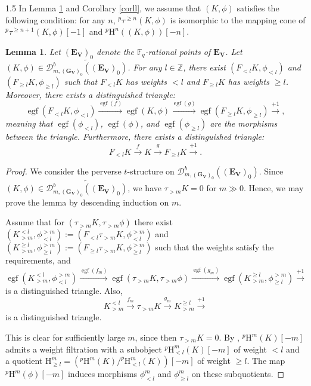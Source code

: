 \documentclass[10pt]{amsart}
\newtheorem{lemma}[theorem]{Lemma}
\begin{document}
\begin{spacing}{1.5}
In Lemma \ref{leqq} and Corollary \ref{corll}, we assume that $(K,\phi)$ satisfies the following condition: for any $n$, ${}^p\tau^{\geq n}(K,\phi)$ is isomorphic to the mapping cone of ${}^p\tau^{\geq n+1}(K,\phi)[-1]$ and ${}^p\mathrm{H}^n((K,\phi))[-n]$.
\begin{lemma}\label{leqq}
Let $(\mathbf{E}_{\mathbf{V}})_0$ denote the $\mathbb{F}_q$-rational points of $\mathbf{E}_{\mathbf{V}}$. Let $(K,\phi) \in \widetilde{\mathcal{D}^{b}_{m,(\mathbf{G}_{\mathbf{V}})_0}((\mathbf{E}_{\mathbf{V}})_0)}$. For any $l \in \mathbb{Z}$, there exist $(F_{<l}K,\phi_{<l})$ and $(F_{\geq l}K,\phi_{\geq l})$ such that $F_{<l}K$ has weights $< l$ and $F_{\geq l}K$ has weights $\geq l$. Moreover, there exists a distinguished triangle:
\[
\operatorname{egf}(F_{<l}K,\phi_{<l}) \xrightarrow{\operatorname{egf}(f)} \operatorname{egf}(K,\phi) \xrightarrow{\operatorname{egf}(g)} \operatorname{egf}(F_{\geq l}K,\phi_{\geq l}) \xrightarrow{+1},
\]
meaning that $\operatorname{egf}(\phi_{<l})$, $\operatorname{egf}(\phi)$, and $\operatorname{egf}(\phi_{\geq l})$ are the morphisms between the triangle. Furthermore, there exists a distinguished triangle:
\[
F_{<l}K \xrightarrow{f} K \xrightarrow{g} F_{\geq l}K \xrightarrow{+1}.
\]
\end{lemma}

\begin{proof}
We consider the perverse $t$-structure on $\mathcal{D}^b_{m,(\mathbf{G}_{\mathbf{V}})_0}((\mathbf{E}_{\mathbf{V}})_0)$. Since $(K,\phi) \in \widetilde{\mathcal{D}^{b}_{m,(\mathbf{G}_{\mathbf{V}})_0}((\mathbf{E}_{\mathbf{V}})_0)}$, we have $\tau_{>m}K = 0$ for $m \gg 0$. Hence, we may prove the lemma by descending induction on $m$.

Assume that for $(\tau_{>m}K,\tau_{>m}\phi)$ there exist $(K_{>m}^{<l},\phi^{>m}_{<l}) := (F_{<l} \tau_{>m}K, \phi^{>m}_{<l})$ and $(K_{>m}^{\geq l},\phi^{>m}_{\geq l}) := (F_{\geq l} \tau_{>m}K, \phi^{>m}_{\geq l})$ such that the weights satisfy the requirements, and
\[
\operatorname{egf}(K_{>m}^{<l},\phi^{>m}_{<l}) \xrightarrow{\operatorname{egf}(f_m)} \operatorname{egf}(\tau_{>m}K,\tau_{>m}\phi) \xrightarrow{\operatorname{egf}(g_m)} \operatorname{egf}(K_{>m}^{\geq l},\phi^{>m}_{\geq l}) \xrightarrow{+1}
\]
is a distinguished triangle. Also,
\[
K_{>m}^{<l} \xrightarrow{f_m} \tau_{>m}K \xrightarrow{g_m} K_{>m}^{\geq l} \xrightarrow{+1}
\]
is a distinguished triangle.

This is clear for sufficiently large $m$, since then $\tau_{>m}K = 0$. By \cite[Theorem 5.4.16]{Pramod-2021}, $^{p}\mathrm{H}^m(K)[-m]$ admits a weight filtration with a subobject $^{p}\mathrm{H}^m_{<l}(K)[-m]$ of weight $< l$ and a quotient $\mathrm{H}^m_{\geq l} = (^{p}\mathrm{H}^m(K)/^{p}\mathrm{H}^m_{<l}(K))[-m]$ of weight $\geq l$. The map $^{p}\mathrm{H}^m(\phi)[-m]$ induces morphisms $\phi^m_{<l}$ and $\phi^m_{\geq l}$ on these subquotients.


\end{proof}
\end{spacing}
\end{document}
